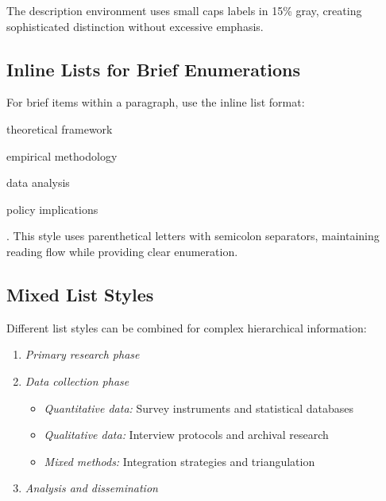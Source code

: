 \documentclass[11pt]{article}
\begin{document}
The description environment uses small caps labels in 15\% gray, creating sophisticated distinction without excessive emphasis.

\subsection{Inline Lists for Brief Enumerations}

For brief items within a paragraph, use the inline list format: \begin{inlineitem}\item theoretical framework\item empirical methodology\item data analysis\item policy implications\end{inlineitem}. This style uses parenthetical letters with semicolon separators, maintaining reading flow while providing clear enumeration.

\subsection{Mixed List Styles}

Different list styles can be combined for complex hierarchical information:

\begin{enumerate}
\item \emph{Primary research phase}
  
\item \emph{Data collection phase}
  \begin{itemize}
  \item \emph{Quantitative data:} Survey instruments and statistical databases
  \item \emph{Qualitative data:} Interview protocols and archival research
  \item \emph{Mixed methods:} Integration strategies and triangulation
  \end{itemize}
  
\item \emph{Analysis and dissemination}
\end{enumerate}
\end{document}

